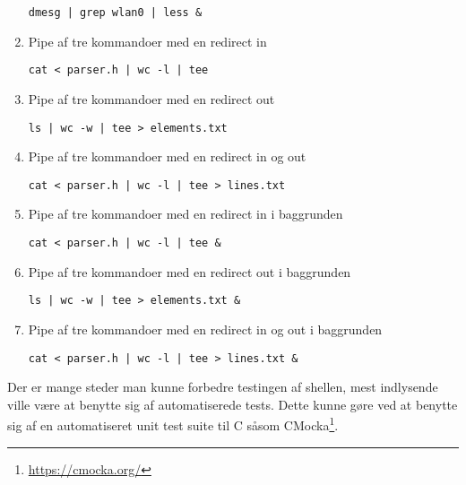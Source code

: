 \begin{enumerate}
	\texttt{dmesg | grep wlan0 | less \&}
	\item  Pipe af tre kommandoer med en redirect in
	
	\texttt{cat < parser.h | wc -l | tee}
	\item  Pipe af tre kommandoer med en redirect out
	
	\texttt{ls | wc -w | tee > elements.txt}
	\item  Pipe af tre kommandoer med en redirect in og out
	
	\texttt{cat < parser.h | wc -l | tee > lines.txt}
	\item  Pipe af tre kommandoer med en redirect in i baggrunden
	
	\texttt{cat < parser.h | wc -l | tee \&}
	\item  Pipe af tre kommandoer med en redirect out i baggrunden
	
	\texttt{ls | wc -w | tee > elements.txt \&}
	\item  Pipe af tre kommandoer med en redirect in og out i baggrunden
	
	\texttt{cat < parser.h | wc -l | tee > lines.txt \&}
\end{enumerate}

Der er mange steder man kunne forbedre testingen af shellen, mest indlysende ville være at benytte sig af automatiserede tests. Dette kunne gøre ved at benytte sig af en automatiseret unit test suite til C såsom CMocka\footnote{\url{https://cmocka.org/}}.
